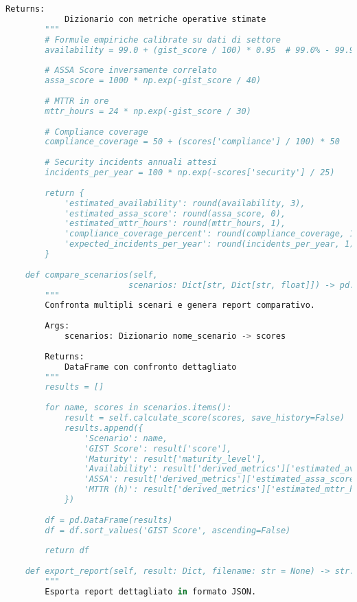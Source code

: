 \begin{lstlisting}[language=Python, caption={Implementazione completa GIST Calculator con validazione e reporting}]
        Returns:
            Dizionario con metriche operative stimate
        """
        # Formule empiriche calibrate su dati di settore
        availability = 99.0 + (gist_score / 100) * 0.95  # 99.0% - 99.95%
        
        # ASSA Score inversamente correlato
        assa_score = 1000 * np.exp(-gist_score / 40)
        
        # MTTR in ore
        mttr_hours = 24 * np.exp(-gist_score / 30)
        
        # Compliance coverage
        compliance_coverage = 50 + (scores['compliance'] / 100) * 50
        
        # Security incidents annuali attesi
        incidents_per_year = 100 * np.exp(-scores['security'] / 25)
        
        return {
            'estimated_availability': round(availability, 3),
            'estimated_assa_score': round(assa_score, 0),
            'estimated_mttr_hours': round(mttr_hours, 1),
            'compliance_coverage_percent': round(compliance_coverage, 1),
            'expected_incidents_per_year': round(incidents_per_year, 1)
        }
    
    def compare_scenarios(self, 
                         scenarios: Dict[str, Dict[str, float]]) -> pd.DataFrame:
        """
        Confronta multipli scenari e genera report comparativo.
        
        Args:
            scenarios: Dizionario nome_scenario -> scores
            
        Returns:
            DataFrame con confronto dettagliato
        """
        results = []
        
        for name, scores in scenarios.items():
            result = self.calculate_score(scores, save_history=False)
            results.append({
                'Scenario': name,
                'GIST Score': result['score'],
                'Maturity': result['maturity_level'],
                'Availability': result['derived_metrics']['estimated_availability'],
                'ASSA': result['derived_metrics']['estimated_assa_score'],
                'MTTR (h)': result['derived_metrics']['estimated_mttr_hours']
            })
        
        df = pd.DataFrame(results)
        df = df.sort_values('GIST Score', ascending=False)
        
        return df
    
    def export_report(self, result: Dict, filename: str = None) -> str:
        """
        Esporta report dettagliato in formato JSON.
        

\end{lstlisting}
